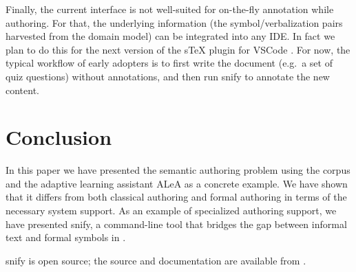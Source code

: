 \documentclass[runningheads]{llncs}
\newcommand\ALeA{\textsf{ALeA}\xspace}
\newcommand\snify{\textsf{snify}\xspace}
\begin{document}
Finally, the current interface is not well-suited for on-the-fly annotation while
authoring.
For that, the underlying information (the symbol/verbalization pairs harvested
from the domain model) can be integrated into any IDE. In fact we plan to do this for the
next version of the sTeX plugin for VSCode \cite{sTeX-IDE:git}.
For now, the typical workflow of early adopters is to first write the document (e.g.\ a set of quiz questions) without annotations, and then run \snify to annotate the new content.

\section{Conclusion}\label{sec:conclusion}

In this paper we have presented the semantic authoring problem using the \sTeX corpus and
the adaptive learning assistant \ALeA as a concrete example. We have shown that it differs
from both classical authoring and formal authoring in terms of the necessary system
support. As an example of specialized authoring support, we have presented \snify, a
command-line tool that bridges the gap between informal text and formal symbols in \sTeX.

\snify is open source; the source and documentation are available from
\cite{stextools:git}.


\printbibliography
\end{document}
